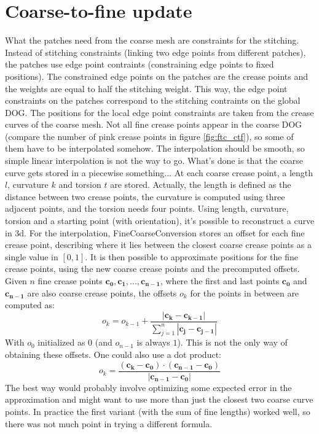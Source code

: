 \documentclass[a4paper,twoside,12pt,nochapterprefix]{scrbook}
\begin{document}
\section{Coarse-to-fine update}\label{sec:ctf_update}
What the patches need from the coarse mesh are constraints for the stitching. Instead of stitching constraints (linking two edge points from different patches), the patches use edge point contraints (constraining edge points to fixed positions). The constrained edge points on the patches are the crease points and the weights are equal to half the stitching weight. This way, the edge point constraints on the patches correspond to the stitching contraints on the global DOG.\newline
The positions for the local edge point constraints are taken from the crease curves of the coarse mesh. Not all fine crease points appear in the coarse DOG (compare the number of pink crease points in figure \ref{fig:ftc_ctf}), so some of them have to be interpolated somehow. The interpolation should be smooth, so simple linear interpolation is not the way to go.
 What's done is that the coarse curve gets stored in a piecewise something... At each coarse crease point, a length $l$, curvature $k$ and torsion $t$ are stored. Actually, the length is defined as the distance between two crease points, the curvature is computed using three adjacent points, and the torsion needs four points. Using length, curvature, torsion and a starting point (with orientation), it's possible to reconstruct a curve in 3d. For the interpolation, FineCoarseConversion stores an offset for each fine crease point, describing where it lies between the closest coarse crease points as a single value in $[0,1]$. It is then possible to approximate positions for the fine crease points, using the new coarse crease points and the precomputed offsets.
Given $n$ fine crease points $\mathbf{c_0}, \mathbf{c_1}, ..., \mathbf{c_{n-1}}$, where the first and last points $\mathbf{c_0}$ and $\mathbf{c_{n-1}}$ are also coarse crease points, the offsets $o_k$ for the points in between are computed as:
\begin{equation}
o_k = o_{k-1} + \frac{|\mathbf{c_k}-\mathbf{c_{k-1}}|}{\sum_{j=1}^n{|\mathbf{c_j}-\mathbf{c_{j-1}}|}}
\end{equation}
With $o_0$ initialized as $0$ (and $o_{n-1}$ is always $1$). This is not the only way of obtaining these offsets. One could also use a dot product:
\begin{equation}
o_k = \frac{(\mathbf{c_k}-\mathbf{c_0}) \cdot (\mathbf{c_{n-1}}-\mathbf{c_0})}{|\mathbf{c_{n-1}}-\mathbf{c_0}|}
\end{equation}
The best way would probably involve optimizing some expected error in the approximation and might want to use more than just the closest two coarse curve points. In practice the first variant (with the sum of fine lengths) worked well, so there was not much point in trying a different formula.\newline
\end{document}
